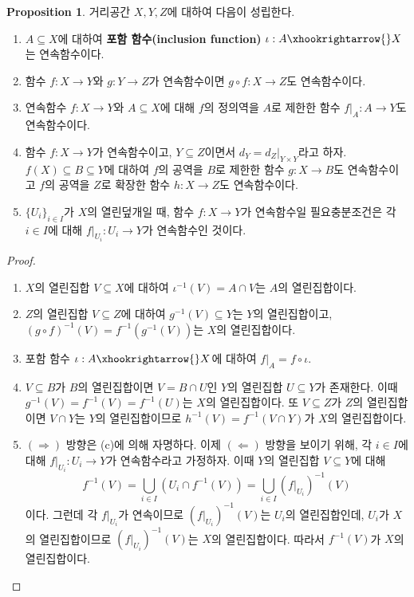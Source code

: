 \documentclass[11pt]{book}
\numberwithin{equation}{chapter}
\def\inclusion{\xhookrightarrow{}}
\theoremstyle{definition}
\newtheorem{prop}[thm]{Proposition}
\newenvironment{enum}
	{\begin{enumerate}[label=(\alph*), leftmargin=2\parindent]}
	{\end{enumerate}}
\begin{document}
\begin{prop}
    거리공간 \(X, Y, Z\)에 대하여 다음이 성립한다.
    \begin{enum}
        \item \(A \subseteq X\)에 대하여 \textbf{포함 함수(inclusion function)} \(\iota: A \inclusion X\)는 연속함수이다.
        \item 함수 \(f : X \to Y\)와 \(g : Y \to Z\)가 연속함수이면 \(g \circ f : X \to Z\)도 연속함수이다.
        \item 연속함수 \(f : X \to Y\)와 \(A \subseteq X\)에 대해 \(f\)의 정의역을 \(A\)로 제한한 함수 \(f \vert_A : A \to Y\)도 연속함수이다.
        \item 함수 \(f : X \to Y\)가 연속함수이고, \(Y \subseteq Z\)이면서 \(d_Y = d_Z \vert_{Y \times Y}\)라고 하자. \(f(X) \subseteq B \subseteq Y\)에 대하여 \(f\)의 공역을 \(B\)로 제한한 함수 \(g : X \to B\)도 연속함수이고 \(f\)의 공역을 \(Z\)로 확장한 함수 \(h : X \to Z\)도 연속함수이다.
        \item \(\{U_i\}_{i \in I}\)가 \(X\)의 열린덮개일 때, 함수 \(f : X \to Y\)가 연속함수일 필요충분조건은 각 \(i \in I\)에 대해 \(f \vert_{U_i} : U_i \to Y\)가 연속함수인 것이다.
    \end{enum}
\end{prop}
\begin{proof}
    \quad

    \begin{enum}
        \item \(X\)의 열린집합 \(V \subseteq X\)에 대하여 \(\iota^{-1}(V) = A \cap V\)는 \(A\)의 열린집합이다.
        \item \(Z\)의 열린집합 \(V \subseteq Z\)에 대하여 \(g^{-1}(V) \subseteq Y\)는 \(Y\)의 열린집합이고, \((g \circ f)^{-1}(V) = f^{-1}(g^{-1}(V))\)는 \(X\)의 열린집합이다.
        \item 포함 함수 \(\iota : A \inclusion X\)에 대하여 \(f \vert_A = f \circ \iota\).
        \item \(V \subseteq B\)가 \(B\)의 열린집합이면 \(V = B \cap U\)인 \(Y\)의 열린집합 \(U \subseteq Y\)가 존재한다. 이때 \(g^{-1}(V) = f^{-1}(V) = f^{-1}(U)\)는 \(X\)의 열린집합이다. 또 \(V \subseteq Z\)가 \(Z\)의 열린집합이면 \(V \cap Y\)는 \(Y\)의 열린집합이므로 \(h^{-1}(V) = f^{-1}(V \cap Y)\)가 \(X\)의 열린집합이다.
        \item \((\Rightarrow)\) 방향은 (c)에 의해 자명하다. 이제 \((\Leftarrow)\) 방향을 보이기 위해, 각 \(i \in I\)에 대해 \(f \vert_{U_i} : U_i \to Y\)가 연속함수라고 가정하자. 이때 \(Y\)의 열린집합 \(V \subseteq Y\)에 대해
        \[
        f^{-1}(V) = \bigcup_{i \in I} (U_i \cap f^{-1}(V)) = \bigcup_{i \in I} (f \vert_{U_i})^{-1}(V)    
        \]
        이다. 그런데 각 \(f \vert_{U_i}\)가 연속이므로 \((f \vert_{U_i})^{-1}(V)\)는 \(U_i\)의 열린집합인데, \(U_i\)가 \(X\)의 열린집합이므로 \((f \vert_{U_i})^{-1}(V)\)는 \(X\)의 열린집합이다. 따라서 \(f^{-1}(V)\)가 \(X\)의 열린집합이다.
    \end{enum}
\end{proof}
\end{document}
